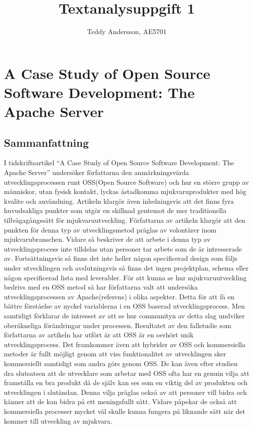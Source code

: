 \documentclass[a4paper]{article}
\title{Textanalysuppgift 1}
\author{Teddy Andersson, AE5701}
\begin{document}
\maketitle
\tableofcontents

\newpage
\section{A Case Study of Open Source Software Development: The Apache Server}
\subsection{Sammanfattning}
I tidskriftsartikel “A Case Study of Open Source Software Development: The Apache Server” undersöker författarna den anmärkningsvärda utvecklingsprocessen runt OSS(Open Source Software) och hur en större grupp av människor, utan fysisk kontakt, lyckas åstadkomma mjukvaruprodukter med hög kvalite och användning. Artikeln klargör även inledningsvis att det finns fyra huvudsakliga punkter som utgör en skillnad gentemot de mer traditionella tillvägagångssätt för mjukvaruutveckling. Författarna av artikeln klargör att den punkten för denna typ av utvecklingsmetod präglas av volontärer inom mjukvarubranschen. Vidare så beskriver de att arbete i denna typ av utvecklingsprocess inte tilldelas utan personer tar arbete som de är intresserade av. Fortsättningsvis så finns det inte heller någon specificerad design som följs under utvecklingen och avslutningsvis så finns det ingen projektplan, schema eller någon specificerad lista med leverabler. 
För att kunna se hur mjukvaruutveckling bedrivs med en OSS metod så har författarna valt att undersöka utvecklingsprocessen av Apache(referens) i olika aspekter. Detta för att få en bättre förståelse av nyckel variablerna i en OSS baserad utvecklingsprocess. Men samtidigt förklarar de intresset av att se hur communityn av detta slag undviker oberäkneliga förändringar under processen. 
Resultatet av den fallstudie som författarna av artikeln har utfört är att OSS är en oerhört unik utvecklingsprocess. Det framkommer även att hybrider av OSS och kommersiella metoder är fullt möjligt genom att viss funktionalitet av utvecklingen sker kommersiellt samtidigt som andra görs genom OSS. De kan även efter studien dra slutsatsen att de utvecklare som arbetar med OSS ofta har en genuin vilja att framställa en bra produkt då de själv kan ses som en viktig del av produkten och utvecklingen i slutändan. Denna vilja präglas också av att personer vill bidra och känner att de kan bidra på ett meningsfullt sätt. Vidare påpekar de också att kommersiella processer mycket väl skulle kunna fungera på liknande sätt när det kommer till utveckling av mjukvara.
\end{document}
